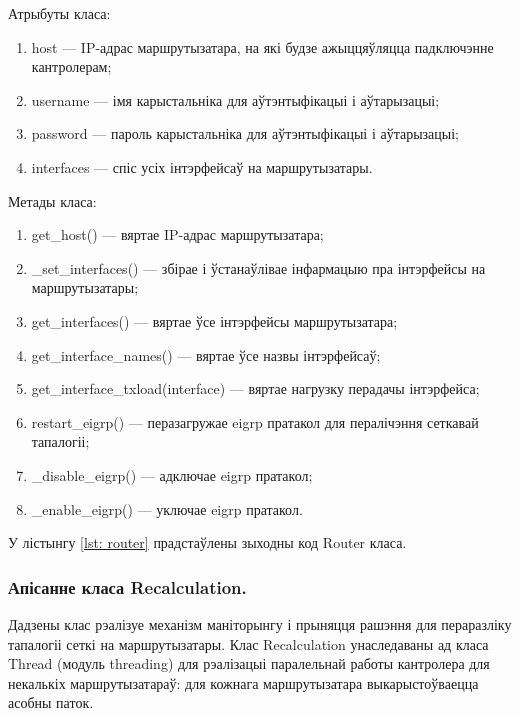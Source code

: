 Атрыбуты класа:
\begin{enumerate}
    \item host --- IP-адрас маршрутызатара, на які будзе ажыццяўляцца падключэнне кантролерам;
    \item username --- імя карыстальніка для аўтэнтыфікацыі і аўтарызацыі;
    \item password --- пароль карыстальніка для аўтэнтыфікацыі і аўтарызацыі;
    \item interfaces --- спіс усіх інтэрфейсаў на маршрутызатары.
\end{enumerate}

Метады класа:
\begin{enumerate}
    \item get\_host() --- вяртае IP-адрас маршрутызатара;
    \item \_set\_interfaces() --- збірае і ўстанаўлівае інфармацыю пра інтэрфейсы на маршрутызатары;
    \item get\_interfaces() --- вяртае ўсе інтэрфейсы маршрутызатара;
    \item get\_interface\_names() --- вяртае ўсе назвы інтэрфейсаў;
    \item get\_interface\_txload(interface) --- вяртае нагрузку перадачы інтэрфейса;
    \item restart\_eigrp() --- перазагружае eigrp пратакол для пералічэння сеткавай тапалогіі;
    \item \_disable\_eigrp() --- адключае eigrp пратакол;
    \item \_enable\_eigrp() --- уключае eigrp пратакол.
\end{enumerate}

У лістынгу \ref{lst: router} прадстаўлены зыходны код Router класа.



\vspace{-\baselineskip}

\subsubsection{Апісанне класа Recalculation.}

Дадзены клас рэалізуе механізм маніторынгу і прыняцця рашэння для пераразліку тапалогіі сеткі на маршрутызатары.
Клас Recalculation унаследаваны ад класа Thread (модуль threading) для рэалізацыі паралельнай работы кантролера для
некалькіх маршрутызатараў: для кожнага маршрутызатара выкарыстоўваецца асобны паток.

